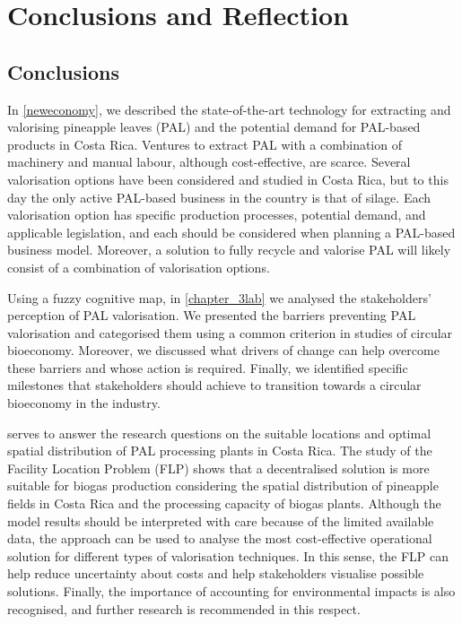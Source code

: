\chapter{Conclusions and Reflection}
\label{concludeGen}

\section{Conclusions}

In \cref{neweconomy}, we described the state-of-the-art technology for extracting and valorising pineapple leaves (PAL) and the potential demand for PAL-based products in Costa Rica. Ventures to extract PAL with a combination of machinery and manual labour, although cost-effective, are scarce. Several valorisation options have been considered and studied in Costa Rica, but to this day the only active PAL-based business in the country is that of silage. Each valorisation option has specific production processes, potential demand, and applicable legislation, and each should be considered when planning a PAL-based business model. Moreover, a solution to fully recycle and valorise PAL will likely consist of a combination of valorisation options. 

Using a fuzzy cognitive map, in \cref{chapter_3lab} we analysed the stakeholders' perception of PAL valorisation. We presented the barriers preventing PAL valorisation and categorised them using a common criterion in studies of circular bioeconomy. Moreover, we discussed what drivers of change can help overcome these barriers and whose action is required. Finally, we identified specific milestones that stakeholders should achieve to transition towards a circular bioeconomy in the industry.

 serves to answer the research questions on the suitable locations and optimal spatial distribution of PAL processing plants in Costa Rica. The study of the Facility Location Problem (FLP) shows that a decentralised solution is more suitable for biogas production considering the spatial distribution of pineapple fields in Costa Rica and the processing capacity of biogas plants. Although the model results should be interpreted with care because of the limited available data, the approach can be used to analyse the most cost-effective operational solution for different types of valorisation techniques. In this sense, the FLP can help reduce uncertainty about costs and help stakeholders visualise possible solutions. Finally, the importance of accounting for environmental impacts is also recognised, and further research is recommended in this respect. 

